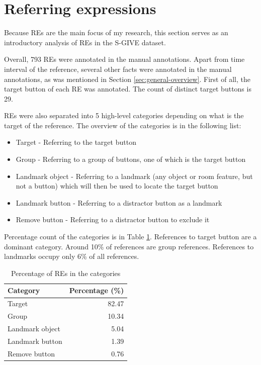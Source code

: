 \section{Referring expressions}
Because REs are the main focus of my research, this section serves as an introductory analysis of REs in the S-GIVE dataset.

Overall, 793 REs were annotated in the manual annotations. Apart from time interval of the reference, several other facts were annotated in the manual annotations, as was mentioned in Section \ref{sec:general-overview}. First of all, the target button of each RE was annotated. The count of distinct target buttons is 29.  

REs were also separated into 5 high-level categories depending on what is the target of the reference. The  overview of the categories is in the following list:

\begin{itemize}
\item
Target - Referring to the target button
\item
Group - Referring to a group of buttons, one of which is the target button
\item
Landmark object - Referring to a landmark (any object or room feature, but not a button) which will then be used to locate the target button
\item
Landmark button - Referring to a distractor button as a landmark
\item
Remove button -  Referring to a distractor button to exclude it
\end{itemize}

Percentage count of the categories is in Table \ref{tab:res-groups}. References to target button are a dominant category. Around 10\% of references are group references. References to landmarks occupy only 6\% of all references.

\begin{table}[!htbp]
 \centering
\begin{tabular}{lr}
\toprule
Category  & Percentage (\%)  \\
\midrule
Target   		& 82.47\\
Group 			& 10.34\\
Landmark object 	& 5.04\\
Landmark button	& 1.39\\
Remove button 	& 0.76\\
\bottomrule
\end{tabular}
\caption{Percentage of REs in the categories}
\label{tab:res-groups}
\end{table} 

